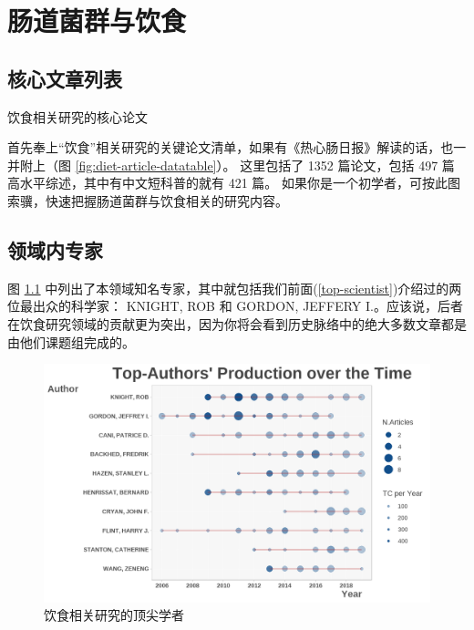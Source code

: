 \documentclass[]{ctexbook}
\begin{document}
\hypertarget{diet}{%
\chapter{肠道菌群与饮食}\label{diet}}

\hypertarget{ux6838ux5fc3ux6587ux7ae0ux5217ux8868}{%
\section{核心文章列表}\label{ux6838ux5fc3ux6587ux7ae0ux5217ux8868}}

\hypertarget{htmlwidget-c921cb4092fa53d28b17}{}

\label{fig:diet-article-datatable}饮食相关研究的核心论文

首先奉上``饮食''相关研究的关键论文清单，如果有《热心肠日报》解读的话，也一并附上（图 \ref{fig:diet-article-datatable}）。
这里包括了 1352 篇论文，包括 497 篇高水平综述，其中有中文短科普的就有 421 篇。
如果你是一个初学者，可按此图索骥，快速把握肠道菌群与饮食相关的研究内容。

\hypertarget{ux9886ux57dfux5185ux4e13ux5bb6}{%
\section{领域内专家}\label{ux9886ux57dfux5185ux4e13ux5bb6}}

图 \ref{fig:diet-article-top-author} 中列出了本领域知名专家，其中就包括我们前面(\ref{top-scientist})介绍过的两位最出众的科学家：
KNIGHT, ROB 和 GORDON, JEFFERY I.。应该说，后者在饮食研究领域的贡献更为突出，因为你将会看到历史脉络中的绝大多数文章都是由他们课题组完成的。

\begin{figure}
\includegraphics[width=1\linewidth]{plots/diet-article-top-author-1} \caption{饮食相关研究的顶尖学者}\label{fig:diet-article-top-author}
\end{figure}
\end{document}
